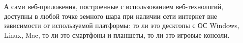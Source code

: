 А сами веб-приложения, построенные с использованием веб-технологий, доступны в любой точке земного шара при наличии сети интернет вне зависимости от используемой платформы: то 
ли это десктопы с ОС Windows, Linux, Mac, то ли это смартфоны и планшеты, то ли это игровые консоли.
